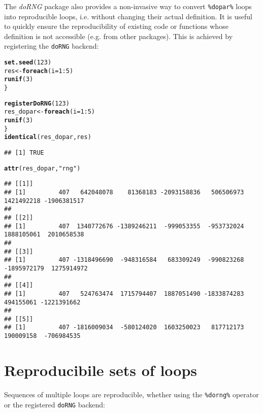 \documentclass[a4paper,12pt]{article}\usepackage{graphicx, color}
\makeatletter
\newcommand{\hlfunctioncall}[1]{\textcolor[rgb]{0.501960784313725,0,0.329411764705882}{\textbf{#1}}}%
\newcommand{\hlstring}[1]{\textcolor[rgb]{0.6,0.6,1}{#1}}%
\newenvironment{kframe}{%
 \def\at@end@of@kframe{}%
 \ifinner\ifhmode%
  \def\at@end@of@kframe{\end{minipage}}%
  \begin{minipage}{\columnwidth}%
 \fi\fi%
 \def\FrameCommand##1{\hskip\@totalleftmargin \hskip-\fboxsep
 \colorbox{shadecolor}{##1}\hskip-\fboxsep
     \hskip-\linewidth \hskip-\@totalleftmargin \hskip\columnwidth}%
 \MakeFramed {\advance\hsize-\width
   \@totalleftmargin\z@ \linewidth\hsize
   \@setminipage}}%
 {\par\unskip\endMakeFramed%
 \at@end@of@kframe}
\newenvironment{knitrout}{}{} %
\renewenvironment{knitrout}{\begin{footnotesize}}{\end{footnotesize}}
\let\code=\texttt
\newcommand{\pkgname}[1]{\textit{#1}\xspace}
\newcommand{\Rpkg}[1]{\pkgname{#1} package\xspace}
\makeatother
\begin{document}
The \Rpkg{doRNG} also provides a non-invasive way to convert \code{\%dopar\%}
loops into reproducible loops, i.e. without changing their actual definition.
It is useful to quickly ensure the reproducibility of existing code or functions
whose definition is not accessible (e.g. from other packages).
This is achieved by registering the \code{doRNG} backend:

\begin{knitrout}
\color{fgcolor}\begin{kframe}
\begin{alltt}

\hlfunctioncall{set.seed}(123)
res <- \hlfunctioncall{foreach}(i = 1:5) %dorng% \{
    \hlfunctioncall{runif}(3)
\}

\hlfunctioncall{registerDoRNG}(123)
res_dopar <- \hlfunctioncall{foreach}(i = 1:5) %dopar% \{
    \hlfunctioncall{runif}(3)
\}
\hlfunctioncall{identical}(res_dopar, res)
\end{alltt}
\begin{verbatim}
## [1] TRUE
\end{verbatim}
\begin{alltt}
\hlfunctioncall{attr}(res_dopar, \hlstring{"rng"})
\end{alltt}
\begin{verbatim}
## [[1]]
## [1]         407   642048078    81368183 -2093158836   506506973  1421492218 -1906381517
## 
## [[2]]
## [1]         407  1340772676 -1389246211  -999053355  -953732024  1888105061  2010658538
## 
## [[3]]
## [1]         407 -1318496690  -948316584   683309249  -990823268 -1895972179  1275914972
## 
## [[4]]
## [1]         407   524763474  1715794407  1887051490 -1833874283   494155061 -1221391662
## 
## [[5]]
## [1]         407 -1816009034  -580124020  1603250023   817712173   190009158  -706984535
\end{verbatim}
\end{kframe}
\end{knitrout}


\section{Reproducibile sets of loops}

Sequences of multiple loops are reproducible, whether using the
\code{\%dorng\%} operator or the registered \code{doRNG} backend:
\end{document}
